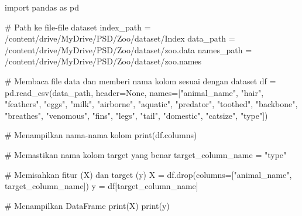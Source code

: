 \documentclass[
  letterpaper,
]{krantz}
\makeatletter
\newenvironment{Shaded}{\begin{snugshade}}{\end{snugshade}}
\newcommand{\BuiltInTok}[1]{\textcolor[rgb]{0.00,0.23,0.31}{#1}}
\newcommand{\CommentTok}[1]{\textcolor[rgb]{0.37,0.37,0.37}{#1}}
\newcommand{\ImportTok}[1]{\textcolor[rgb]{0.00,0.46,0.62}{#1}}
\newcommand{\NormalTok}[1]{\textcolor[rgb]{0.00,0.23,0.31}{#1}}
\newcommand{\OperatorTok}[1]{\textcolor[rgb]{0.37,0.37,0.37}{#1}}
\newcommand{\StringTok}[1]{\textcolor[rgb]{0.13,0.47,0.30}{#1}}
\newcommand{\VariableTok}[1]{\textcolor[rgb]{0.07,0.07,0.07}{#1}}
\newenvironment{kframe}{%
\medskip{}
\setlength{\fboxsep}{.8em}
 \def\at@end@of@kframe{}%
 \ifinner\ifhmode%
  \def\at@end@of@kframe{\end{minipage}}%
  \begin{minipage}{\columnwidth}%
 \fi\fi%
 \def\FrameCommand##1{\hskip\@totalleftmargin \hskip-\fboxsep
 \colorbox{shadecolor}{##1}\hskip-\fboxsep
     \hskip-\linewidth \hskip-\@totalleftmargin \hskip\columnwidth}%
 \MakeFramed {\advance\hsize-\width
   \@totalleftmargin\z@ \linewidth\hsize
   \@setminipage}}%
 {\par\unskip\endMakeFramed%
 \at@end@of@kframe}
\renewenvironment{Shaded}{\begin{kframe}}{\end{kframe}}
\makeatother
\begin{document}
\begin{Shaded}
\begin{Highlighting}[]
\ImportTok{import}\NormalTok{ pandas }\ImportTok{as}\NormalTok{ pd}

\CommentTok{\# Path ke file{-}file dataset}
\NormalTok{index\_path }\OperatorTok{=} \StringTok{\textquotesingle{}/content/drive/MyDrive/PSD/Zoo/dataset/Index\textquotesingle{}}
\NormalTok{data\_path }\OperatorTok{=} \StringTok{\textquotesingle{}/content/drive/MyDrive/PSD/Zoo/dataset/zoo.data\textquotesingle{}}
\NormalTok{names\_path }\OperatorTok{=} \StringTok{\textquotesingle{}/content/drive/MyDrive/PSD/Zoo/dataset/zoo.names\textquotesingle{}}

\CommentTok{\# Membaca file data dan memberi nama kolom sesuai dengan dataset}
\NormalTok{df }\OperatorTok{=}\NormalTok{ pd.read\_csv(data\_path, header}\OperatorTok{=}\VariableTok{None}\NormalTok{, names}\OperatorTok{=}\NormalTok{[}\StringTok{"animal\_name"}\NormalTok{, }\StringTok{"hair"}\NormalTok{, }\StringTok{"feathers"}\NormalTok{, }\StringTok{"eggs"}\NormalTok{, }\StringTok{"milk"}\NormalTok{, }\StringTok{"airborne"}\NormalTok{, }\StringTok{"aquatic"}\NormalTok{, }\StringTok{"predator"}\NormalTok{, }\StringTok{"toothed"}\NormalTok{, }\StringTok{"backbone"}\NormalTok{, }\StringTok{"breathes"}\NormalTok{, }\StringTok{"venomous"}\NormalTok{, }\StringTok{"fins"}\NormalTok{, }\StringTok{"legs"}\NormalTok{, }\StringTok{"tail"}\NormalTok{, }\StringTok{"domestic"}\NormalTok{, }\StringTok{"catsize"}\NormalTok{, }\StringTok{"type"}\NormalTok{])}

\CommentTok{\# Menampilkan nama{-}nama kolom}
\BuiltInTok{print}\NormalTok{(df.columns)}

\CommentTok{\# Memastikan nama kolom target yang benar}
\NormalTok{target\_column\_name }\OperatorTok{=} \StringTok{"type"}

\CommentTok{\# Memisahkan fitur (X) dan target (y)}
\NormalTok{X }\OperatorTok{=}\NormalTok{ df.drop(columns}\OperatorTok{=}\NormalTok{[}\StringTok{"animal\_name"}\NormalTok{, target\_column\_name])}
\NormalTok{y }\OperatorTok{=}\NormalTok{ df[target\_column\_name]}

\CommentTok{\# Menampilkan DataFrame}
\BuiltInTok{print}\NormalTok{(X)}
\BuiltInTok{print}\NormalTok{(y)}
\end{Highlighting}
\end{Shaded}
\end{document}
